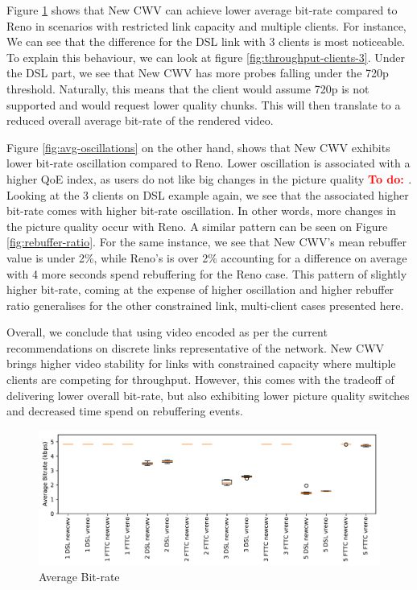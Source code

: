 \documentclass[10pt,sigconf]{acmart}
\newcommand{\todo}[1]{\textbf{\textcolor{red}{To do: #1}}}
\begin{document}
Figure \ref{fig:avg-bitrate} shows that New CWV can achieve lower average bit-rate compared to Reno in scenarios with restricted link capacity and multiple clients. For instance, We can see that the difference for the DSL link with 3 clients is most noticeable. To explain this behaviour, we can look at figure \ref{fig:throughput-clients-3}. Under the DSL part, we see that New CWV has more probes falling under the 720p threshold. Naturally, this means that the client would assume 720p is not supported and would request lower quality chunks. This will then translate to a reduced overall average bit-rate of the rendered video.

Figure \ref{fig:avg-oscillations} on the other hand, shows that New CWV exhibits lower bit-rate oscillation compared to Reno. Lower oscillation is associated with a higher QoE index, as users do not like big changes in the picture quality \todo{\cite{}}. Looking at the 3 clients on DSL example again, we see that the associated higher bit-rate comes with higher bit-rate oscillation. In other words, more changes in the picture quality occur with Reno. A similar pattern can be seen on Figure \ref{fig:rebuffer-ratio}. For the same instance, we see that New CWV's mean rebuffer value is under 2\%, while Reno's is over 2\% accounting for a difference on average with 4 more seconds spend rebuffering for the Reno case. This pattern of slightly higher bit-rate, coming at the expense of higher oscillation and higher rebuffer ratio generalises for the other constrained link, multi-client cases presented here.

Overall, we conclude that using video encoded as per the current recommendations on discrete links representative of the network. New CWV brings higher video stability for links with constrained capacity where multiple clients are competing for throughput. However, this comes with the tradeoff of delivering lower overall bit-rate, but also exhibiting lower picture quality switches and decreased time spend on rebuffering events.




\begin{figure}
  \centering
  \includegraphics[width=\textwidth]{figures/Average_Bitrate.pdf}
  \caption{Average Bit-rate}
  \label{fig:avg-bitrate}
\end{figure}
\end{document}
